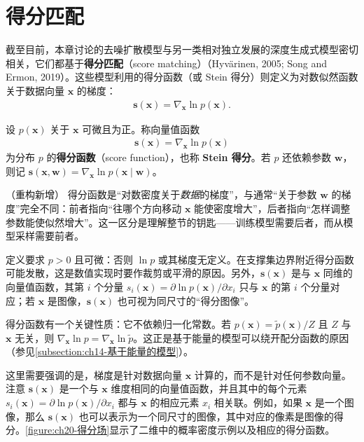 \documentclass[../../main.tex]{subfiles}
\begin{document}
\section{得分匹配}\label{section:ch20-得分匹配}

截至目前，本章讨论的去噪扩散模型与另一类相对独立发展的深度生成式模型密切相关，它们都基于\textbf{得分匹配}（score matching）（Hyvärinen, 2005; Song and Ermon, 2019）。这些模型利用的得分函数（或 Stein 得分）则定义为对数似然函数关于数据向量 $\bm{x}$ 的梯度：
\begin{align}
\bm{s}(\bm{x})=\nabla_{\bm{x}}\ln p(\bm{x}).
\label{align:ch20-得分}
\end{align}

\begin{definition}[得分函数]\label{definition:ch20-得分函数}
设 $p(\bm{x})$ 关于 $\bm{x}$ 可微且为正。称向量值函数
\begin{align*}
\bm{s}(\bm{x})=\nabla_{\bm{x}}\ln p(\bm{x})
\end{align*}
为分布 $p$ 的\textbf{得分函数}（score function），也称 \textbf{Stein 得分}。若 $p$ 还依赖参数 $\bm{w}$，则记 $\bm{s}(\bm{x},\bm{w})=\nabla_{\bm{x}}\ln p(\bm{x}\mid\bm{w})$。
\end{definition}

\begin{remark}（重构新增）
得分函数是“对数密度关于\emph{数据}的梯度”，与通常“关于参数 $\bm{w}$ 的梯度”完全不同：前者指向“往哪个方向移动 $\bm{x}$ 能使密度增大”，后者指向“怎样调整参数能使似然增大”。这一区分是理解整节的钥匙——训练模型需要后者，而从模型采样需要前者。\par
定义要求 $p>0$ 且可微：否则 $\ln p$ 或其梯度无定义。在支撑集边界附近得分函数可能发散，这是数值实现时要作裁剪或平滑的原因。另外，$\bm{s}(\bm{x})$ 是与 $\bm{x}$ 同维的向量值函数，其第 $i$ 个分量 $s_i(\bm{x})=\partial\ln p(\bm{x})/\partial x_i$ 只与 $\bm{x}$ 的第 $i$ 个分量对应；若 $\bm{x}$ 是图像，$\bm{s}(\bm{x})$ 也可视为同尺寸的“得分图像”。\par
得分函数有一个关键性质：它不依赖归一化常数。若 $p(\bm{x})=\widetilde{p}(\bm{x})/Z$ 且 $Z$ 与 $\bm{x}$ 无关，则 $\nabla_{\bm{x}}\ln p=\nabla_{\bm{x}}\ln\widetilde{p}$。这正是基于能量的模型可以绕开配分函数的原因（参见\cref{subsection:ch14-基于能量的模型}）。
\end{remark}

这里需要强调的是，梯度是针对数据向量 $\bm{x}$ 计算的，而不是针对任何参数向量。注意 $\bm{s}(\bm{x})$ 是一个与 $\bm{x}$ 维度相同的向量值函数，并且其中的每个元素 $s_i(\bm{x})=\partial\ln p(\bm{x})/\partial x_i$ 都与 $\bm{x}$ 的相应元素 $x_i$ 相关联。例如，如果 $\bm{x}$ 是一个图像，那么 $\bm{s}(\bm{x})$ 也可以表示为一个同尺寸的图像，其中对应的像素是图像的得分。\cref{figure:ch20-得分场}显示了二维中的概率密度示例以及相应的得分函数。
\end{document}
